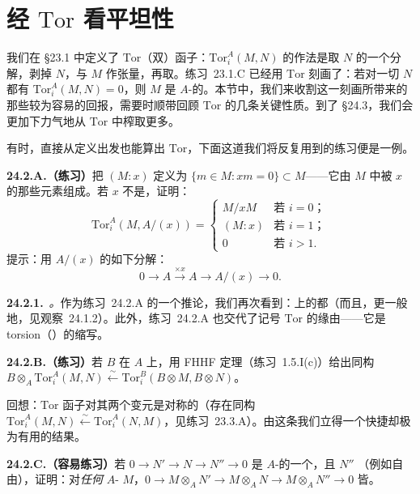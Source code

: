 
\section{经 $\mathrm{Tor}$ 看平坦性}

我们在 \S23.1 中定义了 $\mathrm{Tor}$（双）函子：$\mathrm{Tor}^A_i(M,N)$ 的作法是取 $N$ 的一个\trFreeModule{}分解，剥掉 $N$，与 $M$ 作张量，再取\trHomology。\mbox{练习~23.1.C} 已经用 $\mathrm{Tor}$ 刻画了\trFlatness：若对一切 $N$ 都有 $\mathrm{Tor}^A_i(M,N)=0$，则 $M$ 是 $A$-\trFlat{}的。本节中，我们来收割这一刻画所带来的那些较为容易的回报，需要时顺带回顾 $\mathrm{Tor}$ 的几条关键性质。到了 \S24.3，我们会更加下力气地从 $\mathrm{Tor}$ 中榨取更多。

有时，直接从定义出发也能算出 $\mathrm{Tor}$，下面这道我们将反复用到的练习便是一例。

\textbf{24.2.A.（练习）}\quad 把 $(M:x)$ 定义为 $\{m\in M:xm=0\}\subset M$——它由 $M$ 中被 $x$ \trAnnihilate{}的那些元素组成。若 $x$ 不是\trZerodivisor，证明：
\[
\mathrm{Tor}^A_i(M,A/(x))=
\begin{cases}
M/xM & \text{若 } i=0\text{；}\\
(M:x) & \text{若 } i=1\text{；}\\
0 & \text{若 } i>1.
\end{cases}
\]
提示：用 $A/(x)$ 的如下分解：
\[
0 \longrightarrow A \overset{\times x}{\longrightarrow} A \longrightarrow A/(x) \longrightarrow 0.
\]

\textbf{24.2.1.}\ \emph{\trhRemark。}\quad 作为\mbox{练习~24.2.A} 的一个推论，我们再次看到：\trIntegralDomain{}上的\trFlat\trModule{}都\trTorsionFree（而且，更一般地，见\mbox{观察~24.1.2}）。此外，\mbox{练习~24.2.A} 也交代了记号 $\mathrm{Tor}$ 的缘由——它是 torsion（\trTorsion）的缩写。

\textbf{24.2.B.（练习）}\quad 若 $B$ 在 $A$ 上\trFlat，用 FHHF 定理（\mbox{练习~1.5.I}(c)）给出同构 $B\otimes_A\mathrm{Tor}^A_i(M,N)\overset{\sim}{\longleftarrow}\mathrm{Tor}^B_i(B\otimes M,B\otimes N)$。

回想：$\mathrm{Tor}$ 函子对其两个变元是对称的（存在同构 $\mathrm{Tor}^A_i(M,N)\overset{\sim}{\longleftarrow}\mathrm{Tor}^A_i(N,M)$，见\mbox{练习~23.3.A}）。由这条我们立得一个快捷却极为有用的结果。

\textbf{24.2.C.（容易练习）}\quad 若 $0\to N'\to N\to N''\to 0$ 是 $A$-\trModule{}的一个\trExactSequence，且 $N''$ \trFlat（例如自由），证明：对\emph{任何} $A$-\trModule{} $M$，$0\to M\otimes_A N'\to M\otimes_A N\to M\otimes_A N''\to 0$ 皆\trExact。

